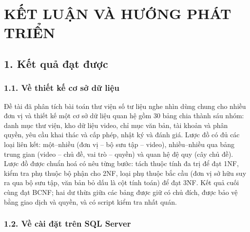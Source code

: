 \chapter*{KẾT LUẬN VÀ HƯỚNG PHÁT TRIỂN}

\section*{1. Kết quả đạt được}

\subsection*{1.1. Về thiết kế cơ sở dữ liệu}

Đề tài đã phân tích bài toán thư viện số tư liệu nghe nhìn dùng chung cho nhiều đơn vị và
thiết kế một cơ sở dữ liệu quan hệ gồm 30 bảng chia thành sáu nhóm: danh mục thư viện, kho dữ
liệu video, chỉ mục văn bản, tài khoản và phân quyền, yêu cầu khai thác và cấp phép, nhật ký
và đánh giá. Lược đồ có đủ các loại liên kết: một--nhiều (đơn vị -- bộ sưu tập -- video),
nhiều--nhiều qua bảng trung gian (video -- chủ đề, vai trò -- quyền) và quan hệ đệ quy (cây
chủ đề). Lược đồ được chuẩn hoá có nêu từng bước: tách thuộc tính đa trị để đạt 1NF, kiểm tra
phụ thuộc bộ phận cho 2NF, loại phụ thuộc bắc cầu (đơn vị sở hữu suy ra qua bộ sưu tập, văn
bản bỏ dấu là cột tính toán) để đạt 3NF. Kết quả cuối cùng đạt BCNF; hai dư thừa giữa các bảng
được giữ có chủ đích, được bảo vệ bằng giao dịch và quyền, và có script kiểm tra nhất quán.

\subsection*{1.2. Về cài đặt trên SQL Server}

